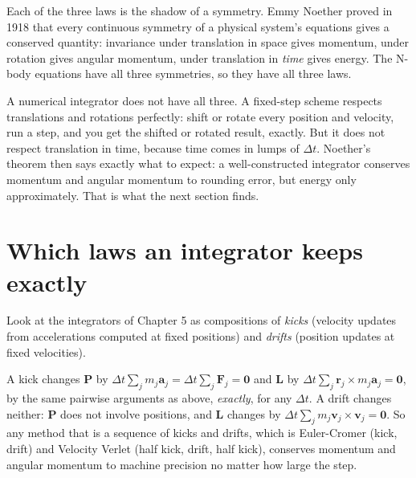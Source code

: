 \documentclass[
  10.5pt,
  letterpaper,
]{scrbook}
\theoremstyle{definition}
\theoremstyle{plain}
\theoremstyle{remark}
\begin{document}
\begin{tcolorbox}[enhanced jigsaw, arc=.35mm, bottomrule=.15mm, bottomtitle=1mm, breakable, colback=white, colbacktitle=quarto-callout-note-color!10!white, colframe=quarto-callout-note-color-frame, coltitle=black, left=2mm, leftrule=.75mm, opacityback=0, opacitybacktitle=0.6, rightrule=.15mm, title={Where it comes from}, titlerule=0mm, toprule=.15mm, toptitle=1mm]

Each of the three laws is the shadow of a symmetry. Emmy Noether proved
in 1918 that every continuous symmetry of a physical system's equations
gives a conserved quantity: invariance under translation in space gives
momentum, under rotation gives angular momentum, under translation in
\emph{time} gives energy. The N-body equations have all three
symmetries, so they have all three laws.

A numerical integrator does not have all three. A fixed-step scheme
respects translations and rotations perfectly: shift or rotate every
position and velocity, run a step, and you get the shifted or rotated
result, exactly. But it does not respect translation in time, because
time comes in lumps of \(\Delta t\). Noether's theorem then says exactly
what to expect: a well-constructed integrator conserves momentum and
angular momentum to rounding error, but energy only approximately. That
is what the next section finds.

\end{tcolorbox}

\section{Which laws an integrator keeps
exactly}\label{which-laws-an-integrator-keeps-exactly}

Look at the integrators of Chapter 5 as compositions of \emph{kicks}
(velocity updates from accelerations computed at fixed positions) and
\emph{drifts} (position updates at fixed velocities).

A kick changes \(\mathbf{P}\) by
\(\Delta t\sum_j m_j\mathbf{a}_j = \Delta t\sum_j\mathbf{F}_j = \mathbf{0}\)
and \(\mathbf{L}\) by
\(\Delta t\sum_j\mathbf{r}_j\times m_j\mathbf{a}_j = \mathbf{0}\), by
the same pairwise arguments as above, \emph{exactly}, for any
\(\Delta t\). A drift changes neither: \(\mathbf{P}\) does not involve
positions, and \(\mathbf{L}\) changes by
\(\Delta t\sum_j m_j\mathbf{v}_j\times\mathbf{v}_j = \mathbf{0}\). So
any method that is a sequence of kicks and drifts, which is Euler-Cromer
(kick, drift) and Velocity Verlet (half kick, drift, half kick),
conserves momentum and angular momentum to machine precision no matter
how large the step.
\end{document}
